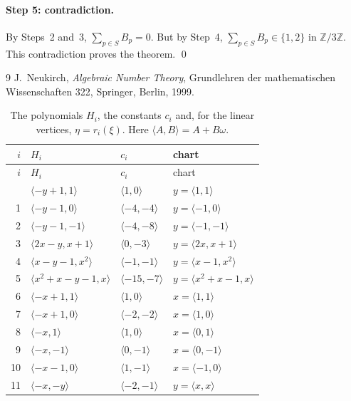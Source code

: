 \documentclass[11pt]{article}
\newcommand{\Z}{\mathbb{Z}}
\begin{document}
\paragraph{Step 5: contradiction.} By Steps~2 and~3, $\sum_{p\in S}B_p=0$. But by Step~4, $\sum_{p\in S}B_p\in\{1,2\}$ in $\Z/3\Z$. This contradiction proves the theorem.
\qed


\begin{thebibliography}{9}
 J.~Neukirch, \emph{Algebraic Number Theory}, Grundlehren der mathematischen Wissenschaften 322, Springer, Berlin, 1999.
\end{thebibliography}

\clearpage
\begingroup\small
\setlength{\LTcapwidth}{\textwidth}
\begin{longtable}{@{}rlll@{}}
\caption{The polynomials $H_i$, the constants $c_i$ and, for the linear vertices, $\eta=r_i(\xi)$. Here $\langle A,B\rangle=A+B\omega$.}\label{tab:vert1}\\
\hline $i$ & $H_i$ & $c_i$ & chart\\\hline\endfirsthead\hline $i$ & $H_i$ & $c_i$ & chart\\\hline\endhead\hline\endfoot
0 & $\langle -y+1,1\rangle$ & $\langle 1,0\rangle$ & $y=\langle 1,1\rangle$\\
1 & $\langle -y-1,0\rangle$ & $\langle -4,-4\rangle$ & $y=\langle -1,0\rangle$\\
2 & $\langle -y-1,-1\rangle$ & $\langle -4,-8\rangle$ & $y=\langle -1,-1\rangle$\\
3 & $\langle 2x-y,x+1\rangle$ & $\langle 0,-3\rangle$ & $y=\langle 2x,x+1\rangle$\\
4 & $\langle x-y-1,x^{2}\rangle$ & $\langle -1,-1\rangle$ & $y=\langle x-1,x^{2}\rangle$\\
5 & $\langle x^{2}+x-y-1,x\rangle$ & $\langle -15,-7\rangle$ & $y=\langle x^{2}+x-1,x\rangle$\\
6 & $\langle -x+1,1\rangle$ & $\langle 1,0\rangle$ & $x=\langle 1,1\rangle$\\
7 & $\langle -x+1,0\rangle$ & $\langle -2,-2\rangle$ & $x=\langle 1,0\rangle$\\
8 & $\langle -x,1\rangle$ & $\langle 1,0\rangle$ & $x=\langle 0,1\rangle$\\
9 & $\langle -x,-1\rangle$ & $\langle 0,-1\rangle$ & $x=\langle 0,-1\rangle$\\
10 & $\langle -x-1,0\rangle$ & $\langle 1,-1\rangle$ & $x=\langle -1,0\rangle$\\
11 & $\langle -x,-y\rangle$ & $\langle -2,-1\rangle$ & $y=\langle x,x\rangle$\\

\end{longtable}
\end{document}
